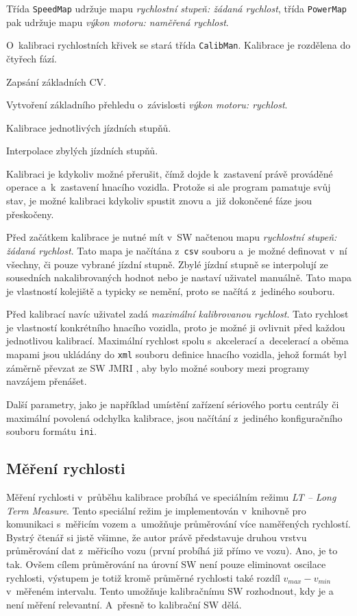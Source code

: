 Třída \texttt{SpeedMap} udržuje mapu \textit{rychlostní stupeň: žádaná rychlost},
třída \texttt{PowerMap} pak udržuje mapu \textit{výkon motoru: naměřená rychlost}.

O~kalibraci rychlostních křivek se stará třída \texttt{CalibMan}. Kalibrace
je rozdělena do čtyřech fází.

\begin{compactenum}
\item Zapsání základních CV.
\item Vytvoření základního přehledu o~závislosti \textit{výkon motoru: rychlost}.
\item Kalibrace jednotlivých jízdních stupňů.
\item Interpolace zbylých jízdních stupňů.
\end{compactenum}

Kalibraci je kdykoliv možné přerušit, čímž dojde k~zastavení právě prováděné
operace a~k~zastavení hnacího vozidla. Protože si ale program pamatuje svůj
stav, je možné kalibraci kdykoliv spustit znovu a~již dokončené fáze jsou
přeskočeny.

Před začátkem kalibrace je nutné mít v~SW načtenou mapu \textit{rychlostní
stupeň: žádaná rychlost}. Tato mapa je načítána z~\texttt{csv} souboru a~je
možné definovat v~ní všechny, či pouze vybrané jízdní stupně. Zbylé jízdní
stupně se interpolují ze sousedních nakalibrovaných hodnot nebo je nastaví
uživatel manuálně. Tato mapa je vlastností kolejiště a typicky se nemění, proto
se načítá z~jediného souboru.

Před kalibrací navíc uživatel zadá \textit{maximální kalibrovanou rychlost}.
Tato rychlost je vlastností konkrétního hnacího vozidla, proto je možné ji
ovlivnit před každou jednotlivou kalibrací. Maximální rychlost spolu
s~akcelerací a~decelerací a oběma mapami jsou ukládány do \texttt{xml} souboru
definice hnacího vozidla, jehož formát byl záměrně převzat ze SW JMRI
\cite{jmri:web}, aby bylo možné soubory mezi programy navzájem přenášet.

Další parametry, jako je například umístění zařízení sériového portu centrály
či maximální povolená odchylka kalibrace, jsou načítání z~jediného
konfiguračního souboru formátu \texttt{ini}.

\subsection{Měření rychlosti}
\label{sec:ac:lt-measure}

Měření rychlosti v~průběhu kalibrace probíhá ve speciálním režimu \textit{LT --
Long Term Measure}. Tento speciální režim je implementován v~knihovně pro komunikaci
s~měřicím vozem a~umožňuje průměrování více naměřených rychlostí. Bystrý čtenář si
jistě všimne, že autor právě představuje druhou vrstvu průměrování dat
z~měřicího vozu (první probíhá již přímo ve vozu). Ano, je to tak. Ovšem cílem
průměrování na úrovní SW není pouze eliminovat oscilace rychlosti, výstupem
je totiž kromě průměrné rychlosti také rozdíl $v_{max} - v_{min}$ v~měřeném
intervalu. Tento  umožňuje kalibračnímu SW rozhodnout, kdy
je a není měření relevantní. A~přesně to kalibrační SW dělá.

